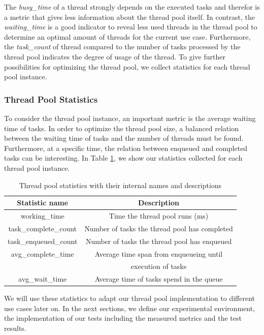 \documentclass[conference]{IEEEtran}
\begin{document}
The \emph{busy\_time} of a thread strongly depends on the executed tasks and therefor is a metric that gives less information about the thread pool itself. In contrast, the \emph{waiting\_time} is a good indicator to reveal less used threads in the thread pool to determine an optimal amount of threads for the current use case. Furthermore, the \emph{task\_count} of thread compared to the number of tasks processed by the thread pool indicates the degree of usage of the thread. To give further possibilities for optimizing the thread pool, we collect statistics for each thread pool instance.

\subsubsection{Thread Pool Statistics}
To consider the thread pool instance, an important metric is the average waiting time of tasks. In order to optimize the thread pool size, a balanced relation between the waiting time of tasks and the number of threads must be found. Furthermore, at a specific time, the relation between enqueued and completed tasks can be interesting. In Table \ref{tab4}, we show our statistics collected for each thread pool instance.

\begin{table}[htbp]
	\caption{Thread pool statistics with their internal names and descriptions}
	\begin{center}
		\begin{tabular}{ c c }
			\hline
			\textbf{Statistic name}&\textbf{Description}\\
			\hline
			working\_time & Time the thread pool runs (ms) \\
			task\_complete\_count & Number of tasks the thread pool has completed\\
			task\_enqueued\_count & Number of tasks the thread pool has enqueued \\
			avg\_complete\_time & Average time span from enqueueing until \\
			& execution of tasks \\
			avg\_wait\_time & Average time of tasks spend in the queue \\
			\hline
		\end{tabular}
		\label{tab4}
	\end{center}
\end{table}

We will use these statistics to adapt our thread pool implementation to different use cases later on. In the next sections, we define our experimental environment, the implementation of our tests including the measured metrics and the test results.
\end{document}
